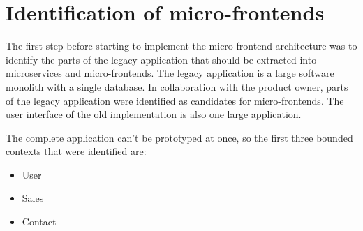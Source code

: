 \section{Identification of micro-frontends}\label{section:applied-methods:identification-micro-frontends}

The first step before starting to implement the micro-frontend architecture was to identify the parts of the legacy application that should be extracted into microservices and micro-frontends. The legacy application is a large software monolith with a single database. In collaboration with the product owner, parts of the legacy application were identified as candidates for micro-frontends. The user interface of the old implementation is also one large application.

\bigskip

\noindent The complete application can't be prototyped at once, so the first three bounded contexts that were identified are: 

\begin{itemize}
  \item User
  \item Sales
  \item Contact
\end{itemize}